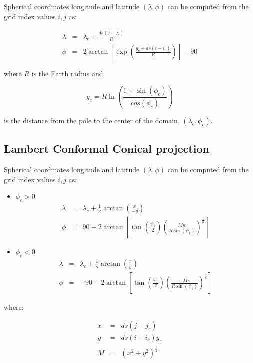 Spherical coordinates longitude and latitude $(\lambda, \phi)$ can be computed
from the grid index values $i,j$ as:

\begin{eqnarray}
  \lambda &=& \lambda_c + \frac{ds \left(j-j_c\right)}{R} \\
  \phi &=& 2 \arctan\left[\exp\left(\frac{y_c +
                ds\left(i-i_c\right)}{R}\right)\right]-90
\end{eqnarray}

where $R$ is the Earth radius and

\begin{equation}
  y_c = R \ln \left(\frac{1+\sin(\phi_c)}{cos(\phi_c)}\right)
\end{equation}

is the distance from the pole to the center of the domain, $(\lambda_c,\phi_c)$.

\subsection{Lambert Conformal Conical projection}

Spherical coordinates longitude and latitude $(\lambda, \phi)$ can be computed
from the grid index values $i,j$ as:

\begin{itemize}
  \item $\phi_c > 0$
    \begin{eqnarray}
      \lambda &=& \lambda_c + 
         \frac{1}{\kappa}\arctan\left(\frac{x}{-y}\right) \\
      \phi &=& 90 - 2 \arctan\left[ \tan\left(\frac{\psi_1}{2}\right) \left(
         \frac{M \kappa}{R \sin(\psi_1)}\right)^{\frac{1}{\kappa}}\right]
    \end{eqnarray}
  \item $\phi_c < 0$
    \begin{eqnarray}
      \lambda &=& \lambda_c + 
         \frac{1}{\kappa} \arctan \left(\frac{x}{y}\right) \\
      \phi &=& -90 - 2 \arctan\left[ \tan\left(\frac{\psi_1}{2}\right) \left(
         \frac{-M \kappa}{R \sin(\psi_1)}\right)^{\frac{1}{\kappa}}\right]
    \end{eqnarray}
\end{itemize}

where:

\begin{eqnarray}
  x &=& ds \left(j-j_c\right) \\
  y &=& ds \left(i-i_c\right) y_c\\
  M &=& \left(x^2+y^2\right)^{\frac{1}{2}} \\
\end{eqnarray}

